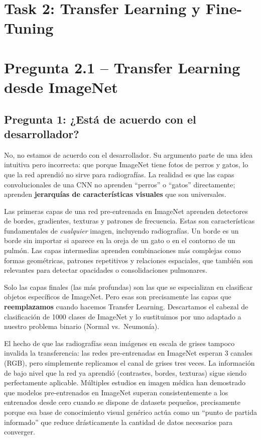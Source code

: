 \documentclass[12pt, letterpaper]{article}
\begin{document}
\newpage
\section*{\LARGE Task 2: Transfer Learning y Fine-Tuning}

\noindent

\section{Pregunta 2.1 -- Transfer Learning desde ImageNet}

\subsection{Pregunta 1: ¿Está de acuerdo con el desarrollador?}

No, no estamos de acuerdo con el desarrollador. Su argumento parte de una idea intuitiva pero
incorrecta: que porque ImageNet tiene fotos de perros y gatos, lo que la red aprendió no sirve
para radiografías. La realidad es que las capas convolucionales de una CNN no aprenden ``perros''
o ``gatos'' directamente; aprenden \textbf{jerarquías de características visuales} que son
universales.

Las primeras capas de una red pre-entrenada en ImageNet aprenden detectores de bordes,
gradientes, texturas y patrones de frecuencia. Estas son características fundamentales de
\textit{cualquier} imagen, incluyendo radiografías. Un borde es un borde sin importar si
aparece en la oreja de un gato o en el contorno de un pulmón. Las capas intermedias aprenden
combinaciones más complejas como formas geométricas, patrones repetitivos y relaciones
espaciales, que también son relevantes para detectar opacidades o consolidaciones pulmonares.

Solo las capas finales (las más profundas) son las que se especializan en clasificar objetos
específicos de ImageNet. Pero esas son precisamente las capas que \textbf{reemplazamos} cuando
hacemos Transfer Learning. Descartamos el cabezal de clasificación de 1000 clases de ImageNet
y lo sustituimos por uno adaptado a nuestro problema binario (Normal vs.\ Neumonía).

El hecho de que las radiografías sean imágenes en escala de grises tampoco invalida la
transferencia: las redes pre-entrenadas en ImageNet esperan 3 canales (RGB), pero simplemente
replicamos el canal de grises tres veces. La información de bajo nivel que la red ya aprendió
(contrastes, bordes, texturas) sigue siendo perfectamente aplicable. Múltiples estudios en
imagen médica han demostrado que modelos pre-entrenados en ImageNet superan consistentemente
a los entrenados desde cero cuando se dispone de datasets pequeños, precisamente porque esa
base de conocimiento visual genérico actúa como un ``punto de partida informado'' que reduce
drásticamente la cantidad de datos necesarios para converger.
\end{document}
